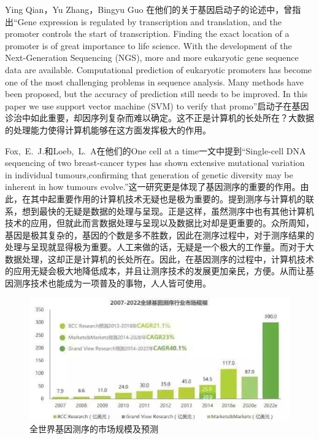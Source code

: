 \documentclass{article}
\begin{document}
  Ying Qian，Yu Zhang，Bingyu Guo  在他们的关于基因启动子的论述中，曾指出“Gene expression is regulated by transcription and translation, and the promoter controls the start of transcription. Finding the exact location of a promoter is of great importance to life science. With the development of the Next-Generation Sequencing (NGS), more and more eukaryotic gene sequence data are available. Computational prediction of eukaryotic promoters has become one of the most challenging problems in sequence analysis. Many methods have been proposed, but the accuracy of prediction still needs to be improved. In this paper we use support vector machine (SVM) to verify that promo”\citep{d}启动子在基因诊治中如此重要，却因序列复杂而难以确定。这不正是计算机的长处所在？大数据的处理能力使得计算机能够在这方面发挥极大的作用。\par 
Fox, E. J.和Loeb, L. A在他们的One cell at a time一文中提到“Single-cell DNA sequencing of two breast-cancer types has shown extensive mutational variation in individual tumours,confirming that generation of genetic diversity may be inherent in how tumours evolve.”这一研究更是体现了基因测序的重要的作用。由此，在其中起重要作用的计算机技术无疑也是极为重要的。提到测序与计算机的联系，想到最快的无疑是数据的处理与呈现。正是这样，虽然测序中也有其他计算机技术的应用，但就此而言数据处理与呈现以及数据比对却是更重要的。众所周知，基因是极其复杂的，基因的个数是多不胜数，因此在测序过程中，对于测序结果的处理与呈现就显得极为重要。人工来做的话，无疑是一个极大的工作量。而对于大数据处理，这却正是计算机的长处所在。因此，在基因测序的过程中，计算机技术的应用无疑会极大地降低成本，并且让测序技术的发展更加亲民，方便。从而让基因测序技术也能成为一项普及的事物，人人皆可使用。\par 
\begin{figure}[h!]
	\centering
	\includegraphics[scale=0.7]{shijiecexuguimoyuce}
	\caption{全世界基因测序的市场规模及预测}
	\label{fig:shijiecexuguimoyuce}
\end{figure}
\end{document}

